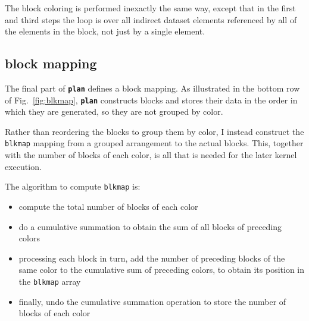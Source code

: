 \documentclass[12pt]{article}
\begin{document}
The block coloring is performed inexactly the same way, except 
that in the first and third steps the loop is over all indirect
dataset elements referenced by all of the elements in the block, 
not just by a single element.

\newpage

\subsection{block mapping}

The final part of {\tt \bf plan} defines a block mapping.
As illustrated in the bottom row of Fig.~\ref{fig:blkmap}, 
{\tt \bf plan} constructs blocks and stores their data in 
the order in which they are generated, so they are not 
grouped by color.

Rather than reordering the blocks to group them by color, 
I instead construct the {\tt blkmap} mapping from a grouped 
arrangement to the actual blocks.  This, together with the 
number of blocks of each color, is all that is needed for 
the later kernel execution.

The algorithm to compute {\tt blkmap} is:
\begin{itemize}
\item
compute the total number of blocks of each color
\item
do a cumulative summation to obtain the sum
of all blocks of preceding colors
\item
processing each block in turn, add the number of preceding
blocks of the same color to the cumulative sum of
preceding colors, to obtain its position in the {\tt blkmap} 
array
\item
finally, undo the cumulative summation operation to store 
the number of blocks of each color
\end{itemize}
\end{document}
